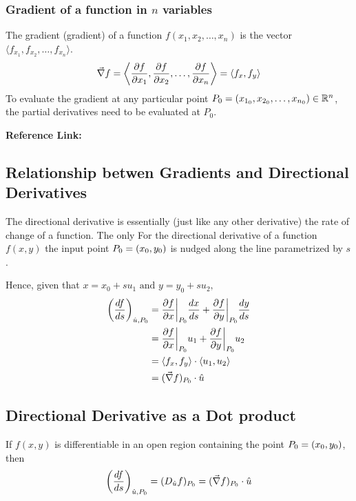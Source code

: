 \subsubsection{Gradient of a function in \texorpdfstring{$n$}{n} variables}
The gradient (gradient) of a function $f(x_1, x_2, \hdots, x_n)$ is the vector
$\langle f_{x_1}, f_{x_2}, \hdots, f_{x_n} \rangle$.
\begin{equation}
    \vec{\nabla} f = \left\langle \frac{\partial f}{\partial x_1}, \frac{\partial f}{\partial x_2}, \hdots, \frac{\partial f}{\partial x_n} \right\rangle
    = \langle f_x, f_y\rangle
\end{equation}
To evaluate the gradient at any particular point $P_0 = (x_{1_0}, x_{2_0}, \hdots, x_{n_0}) \in \mathbb{R}^n$, the partial
derivatives need to be evaluated at $P_0$.

\textbf{Reference Link:}


\subsection{Relationship betwen Gradients and Directional Derivatives}
The directional derivative is essentially (just like any other derivative) the rate of change of a function. The only
For the directional derivative of a function $f(x, y)$ the input point $P_0 = (x_0, y_0)$ is nudged along the line
parametrized by $s$.

Hence, given that $x = x_0 + su_1 \text{ and } y = y_0 + su_2,$
\begin{align*}
    \left( \frac{df}{ds} \right)_{\hat{u}, P_0} &= \frac{\partial f}{\partial x} \bigg|_{P_0} \frac{dx}{ds} +
    \frac{\partial f}{\partial y} \bigg|_{P_0} \frac{dy}{ds} \\
    &= \frac{\partial f}{\partial x} \bigg|_{P_0} u_1 + \frac{\partial f}{\partial y} \bigg|_{P_0} u_2 \\
    &= \langle f_x, f_y \rangle \cdot \langle u_1, u_2 \rangle \\
    &= (\vec{\nabla} f)_{P_0} \cdot \hat{u}
\end{align*}


\subsection{Directional Derivative as a Dot product}

\begin{theorem}
    If $f(x, y)$ is differentiable in an open region containing the point $P_0 = (x_0, y_0)$, then
    \begin{equation}
        \left( \frac{df}{ds} \right)_{\hat{u}, P_0} = (D_{\hat{u}}f)_{P_0} = (\vec{\nabla} f)_{P_0} \cdot \hat{u}
    \end{equation}
\end{theorem}


